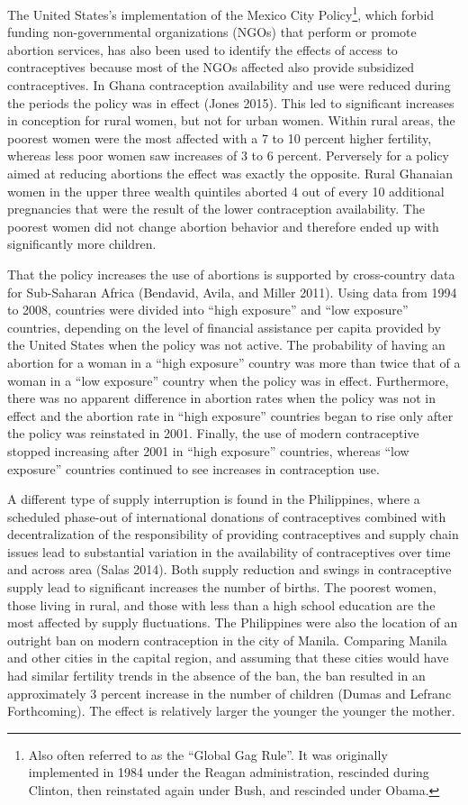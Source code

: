 \documentclass[]{article}
\begin{document}
The United States's implementation of the Mexico City Policy\footnote{Also often referred to as the ``Global Gag Rule''. It was originally implemented in 1984 under the Reagan administration, rescinded during Clinton, then reinstated again under Bush, and rescinded under Obama.}, which forbid funding non-governmental organizations (NGOs) that perform or promote abortion services, has also been used to identify the effects of access to contraceptives because most of the NGOs affected also provide subsidized contraceptives. In Ghana contraception availability and use were reduced during the periods the policy was in effect (Jones 2015). This led to significant increases in conception for rural women, but not for urban women. Within rural areas, the poorest women were the most affected with a 7 to 10 percent higher fertility, whereas less poor women saw increases of 3 to 6 percent. Perversely for a policy aimed at reducing abortions the effect was exactly the opposite. Rural Ghanaian women in the upper three wealth quintiles aborted 4 out of every 10 additional pregnancies that were the result of the lower contraception availability. The poorest women did not change abortion behavior and therefore ended up with significantly more children.

That the policy increases the use of abortions is supported by cross-country data for Sub-Saharan Africa (Bendavid, Avila, and Miller 2011). Using data from 1994 to 2008, countries were divided into ``high exposure'' and ``low exposure'' countries, depending on the level of financial assistance per capita provided by the United States when the policy was not active. The probability of having an abortion for a woman in a ``high exposure'' country was more than twice that of a woman in a ``low exposure'' country when the policy was in effect. Furthermore, there was no apparent difference in abortion rates when the policy was not in effect and the abortion rate in ``high exposure'' countries began to rise only after the policy was reinstated in 2001. Finally, the use of modern contraceptive stopped increasing after 2001 in ``high exposure'' countries, whereas ``low exposure'' countries continued to see increases in contraception use.

A different type of supply interruption is found in the Philippines, where a scheduled phase-out of international donations of contraceptives combined with decentralization of the responsibility of providing contraceptives and supply chain issues lead to substantial variation in the availability of contraceptives over time and across area (Salas 2014). Both supply reduction and swings in contraceptive supply lead to significant increases the number of births. The poorest women, those living in rural, and those with less than a high school education are the most affected by supply fluctuations. The Philippines were also the location of an outright ban on modern contraception in the city of Manila. Comparing Manila and other cities in the capital region, and assuming that these cities would have had similar fertility trends in the absence of the ban, the ban resulted in an approximately 3 percent increase in the number of children (Dumas and Lefranc Forthcoming). The effect is relatively larger the younger the younger the mother.
\end{document}

